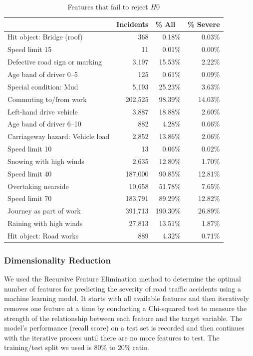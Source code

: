 \begin{table}[ht]
    \centering
    \begin{tabular}{@{}lrrr@{}}
        \toprule
        & \multicolumn{1}{l}{Incidents} & \multicolumn{1}{l}{\% All} & \multicolumn{1}{l}{\% Severe} \\ \midrule
        Hit object: Bridge (roof) & 368 & 0.18\% & 0.03\% \\
        Speed limit 15 & 11 & 0.01\% & 0.00\% \\
        Defective road sign or marking & 3,197 & 15.53\% & 2.22\% \\
        Age band of driver 0--5 & 125 & 0.61\% & 0.09\% \\
        Special condition: Mud & 5,193 & 25.23\% & 3.63\% \\
        Commuting to/from work & 202,525 & 98.39\% & 14.03\% \\
        Left-hand drive vehicle & 3,887 & 18.88\% & 2.60\% \\
        Age band of driver 6--10 & 882 & 4.28\% & 0.66\% \\
        Carriageway hazard: Vehicle load & 2,852 & 13.86\% & 2.06\% \\
        Speed limit 10 & 13 & 0.06\% & 0.02\% \\
        Snowing with high winds & 2,635 & 12.80\% & 1.70\% \\
        Speed limit 40 & 187,000 & 90.85\% & 12.81\% \\
        Overtaking nearside & 10,658 & 51.78\% & 7.65\% \\
        Speed limit 70 & 183,791 & 89.29\% & 12.82\% \\
        Journey as part of work & 391,713 & 190.30\% & 26.89\% \\
        Raining with high winds & 27,813 & 13.51\% & 1.87\% \\
        Hit object: Road works & 889 & 4.32\% & 0.71\% \\ \bottomrule
    \end{tabular}
    \vspace{5}
    \caption{Features that fail to reject $H0$}
    \label{tab:associations_reject}
\end{table}

\subsubsection{Dimensionality Reduction}

We used the Recursive Feature Elimination method to determine the optimal number of features for predicting the severity of road traffic accidents using a machine learning model.
It starts with all available features and then iteratively removes one feature at a time by conducting a Chi-squared test to measure the strength of the relationship between each feature and the target variable.
The model's performance (recall score) on a test set is recorded and then continues with the iterative process until there are no more features to test.
The training/test split we used is 80\% to 20\% ratio.

